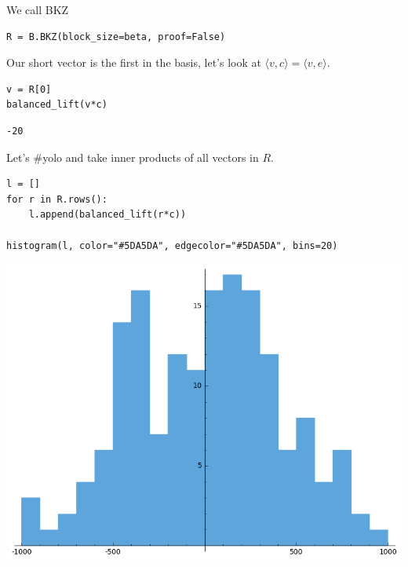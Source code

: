 \documentclass[10pt,a4paper,nobib]{tufte-handout}
\begin{document}
We call BKZ

\lstset{language=sage,label= ,caption= ,captionpos=b,numbers=none}
\begin{lstlisting}
R = B.BKZ(block_size=beta, proof=False)
\end{lstlisting}

Our short vector is the first in the basis, let’s look at \(⟨v,c⟩ = ⟨v,e⟩\).

\lstset{language=sage,label= ,caption= ,captionpos=b,numbers=none}
\begin{lstlisting}
v = R[0]
balanced_lift(v*c)
\end{lstlisting}

\begin{verbatim}
-20
\end{verbatim}

Let’s \#yolo and take inner products of all vectors in \(R\).

\lstset{language=sage,label= ,caption= ,captionpos=b,numbers=none}
\begin{lstlisting}
l = []
for r in R.rows():
    l.append(balanced_lift(r*c))

histogram(l, color="#5DA5DA", edgecolor="#5DA5DA", bins=20)
\end{lstlisting}

\begin{center}
\includegraphics[width=.9\linewidth]{lab-02-solution-dual-attack-histogram.png}
\end{center}
\end{document}
